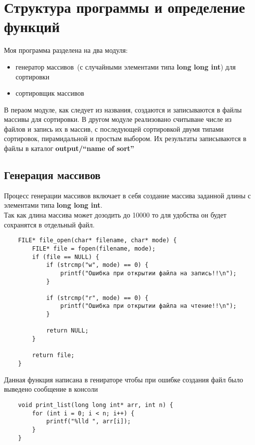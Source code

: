 \documentclass[a4paper,12pt,titlepage,finall]{article}
\begin{document}
\section{Структура программы и определение функций}

Моя программа разделена на два модуля:
\begin{itemize}
    \item генератор массивов~(с случайными элементами типа \textbf{long long int}) для сортировки
    \item сортировщик массивов
\end{itemize}

В пераом модуле, как следует из названия, создаются и записываются в файлы массивы для сортировки.
В другом модуле реализовано считыване числе из файлов и запись их в массив, с последующей сортировкой
двумя типами сортировок, пирамидальной и простым выбором. Их результаты записываются в файлы
в каталог \textbf{output/``name of sort''}

\subsection{Генерация массивов}

Процесс генерации массивов включает в себя создание массива заданной длины с элементами типа \textbf{long long int}. \\
Так как длина массива может дозодить до 10000 то для удобства он будет сохранятся в отдельный файл.

\begin{verbatim}
    FILE* file_open(char* filename, char* mode) {
        FILE* file = fopen(filename, mode);
        if (file == NULL) {
            if (strcmp("w", mode) == 0) {
                printf("Ошибка при открытии файла на запись!!\n");
            }

            if (strcmp("r", mode) == 0) {
                printf("Ошибка при открытии файла на чтение!!\n");
            }

            return NULL;
        }

        return file;
    }
\end{verbatim}

Данная функция написана в генираторе чтобы при ошибке создания файл было выведено сообщение в консоли

\begin{verbatim}
    void print_list(long long int* arr, int n) {
        for (int i = 0; i < n; i++) {
            printf("%lld ", arr[i]);
        }
    }
\end{verbatim}
\end{document}
